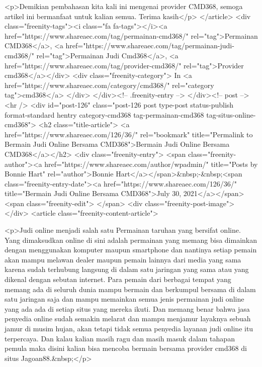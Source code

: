 <p>Demikian pembahasan kita kali ini mengenai provider CMD368, semoga artikel ini bermanfaat untuk kalian semua. Terima kasih</p>
									</article>
																			<div class="freenity-tags"><i class="fa fa-tags"></i><a href="https://www.shareaec.com/tag/permainan-cmd368/" rel="tag">Permainan CMD368</a>, <a href="https://www.shareaec.com/tag/permainan-judi-cmd368/" rel="tag">Permainan Judi Cmd368</a>, <a href="https://www.shareaec.com/tag/provider-cmd368/" rel="tag">Provider cmd368</a></div>
																			<div class="freenity-category">
											In <a href="https://www.shareaec.com/category/cmd368/" rel="category tag">cmd368</a>										</div>
																	</div><!-- .freenity-entry -->
							</div><!-- post -->
							<hr />
													<div id="post-126" class="post-126 post type-post status-publish format-standard hentry category-cmd368 tag-permainan-cmd368 tag-situs-online-cmd368">
								<h2 class="title-article">
									<a href="https://www.shareaec.com/126/36/" rel="bookmark" title="Permalink to Bermain Judi Online Bersama CMD368">Bermain Judi Online Bersama CMD368</a></h2>
								<div class="freenity-entry">
									<span class="freenity-author"><a href="https://www.shareaec.com/author/wpadmin/" title="Posts by Bonnie Hart" rel="author">Bonnie Hart</a></span>&nbsp;-&nbsp;<span class="freenity-entry-date"><a href="https://www.shareaec.com/126/36/" title="Bermain Judi Online Bersama CMD368">July 30, 2021</a></span>
									<span class="freenity-edit"> </span>
									<div class="freenity-post-image">  </div>
																		<article class="freenity-content-article">
										
<p>Judi online menjadi salah satu Permainan taruhan yang bersifat online. Yang dimaksudkan online di sini adalah permainan yang memang bisa dimainkan dengan menggunakan komputer maupun smartphone dan nantinya setiap pemain akan mampu melawan dealer maupun pemain lainnya dari media yang sama karena sudah terhubung langsung di dalam satu jaringan yang sama atau yang dikenal dengan sebutan internet. Para pemain dari berbagai tempat yang memang ada di seluruh dunia mampu bermain dan berkumpul bersama di dalam satu jaringan saja dan mampu memainkan semua jenis permainan judi online yang ada ada di setiap situs yang mereka ikuti. Dan memang benar bahwa jasa penyedia online sudah semakin melarat dan mampu menjamur layaknya sebuah jamur di musim hujan, akan tetapi tidak semua penyedia layanan judi online itu terpercaya. Dan kalau kalian masih ragu dan masih masuk dalam tahapan pemula maka disini kalian bisa mencoba bermain bersama provider cmd368 di situs Jagoan88.&nbsp;</p>



